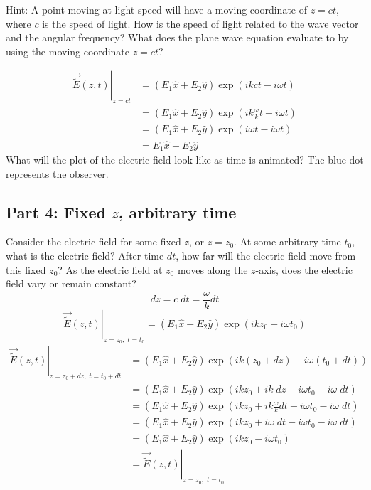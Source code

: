 \documentclass{article}
\begin{document}
Hint: A point moving at light speed will have a moving coordinate of $z=ct$, where $c$ is the speed of light.  How is the speed of light related to the wave vector and the angular frequency?  What does the plane wave equation evaluate to by using the moving coordinate $z=ct$?

\begin{align}
     \left.\vec{\widetilde{E}}\left(z,t\right)\right\rvert_{z=ct} &= \left(E_1\hat{x} + E_2\hat{y}\right) \exp \left(ikct- i \omega t\right)  \\
     &= \left(E_1\hat{x} + E_2\hat{y}\right) \exp \left(ik\frac{\omega}{k}t - i \omega t\right) \\
     &= \left(E_1\hat{x} + E_2\hat{y}\right) \exp \left(i\omega t- i \omega t\right)   \\
     &= E_1\hat{x} + E_2\hat{y} 
\end{align}
What will the plot of the electric field look like as time is animated?  The blue dot represents the observer.

\subsection{Part 4: Fixed $z$, arbitrary time}
Consider the electric field for some fixed $z$, or $z=z_0$.  At some arbitrary time $t_0$, what is the electric field?  After time $dt$,  how far will the electric field move from this fixed $z_0$?  As the electric field at $z_0$ moves along the $z$-axis, does the electric field vary or remain constant?
\begin{equation}
    dz = c\;dt = \frac{\omega}{k}dt
\end{equation}
\begin{equation}
    \left.\vec{\widetilde{E}}\left(z,t\right)\right\rvert_{z=z_0,\;t=t_0} = \left(E_1\hat{x} + E_2\hat{y}\right) \exp \left(ikz_0- i \omega t_0\right)
\end{equation}
\begin{align}
     \left.\vec{\widetilde{E}}\left(z,t\right)\right\rvert_{z=z_0+dz,\;t=t_0+dt} &= \left(E_1\hat{x} + E_2\hat{y}\right) \exp \left(ik(z_0+dz)- i \omega (t_0+dt)\right)   \\
     &= \left(E_1\hat{x} + E_2\hat{y}\right) \exp \left(ikz_0+ik\;dz- i \omega t_0- i \omega\;dt\right)   \\
     &= \left(E_1\hat{x} + E_2\hat{y}\right) \exp \left(ikz_0+ik\frac{\omega}{k}dt- i \omega t_0- i \omega\;dt\right)   \\
     &= \left(E_1\hat{x} + E_2\hat{y}\right) \exp \left(ikz_0+i\omega\; dt- i \omega t_0- i \omega\;dt\right)   \\
     &= \left(E_1\hat{x} + E_2\hat{y}\right) \exp \left(ikz_0- i \omega t_0\right)   \\
     &=\left.\vec{\widetilde{E}}\left(z,t\right)\right\rvert_{z=z_0,\;t=t_0}
\end{align}
\end{document}
